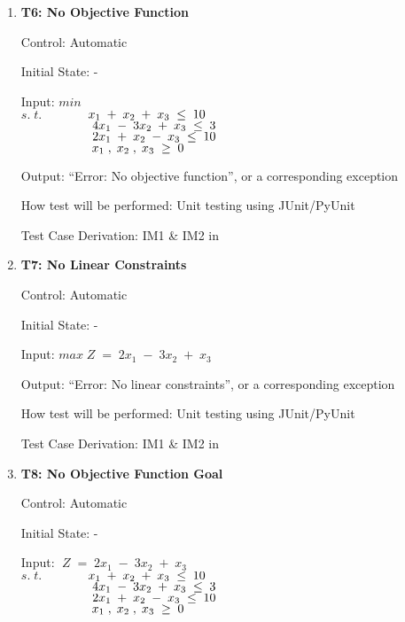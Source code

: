 \documentclass[12pt, titlepage]{article}
\begin{document}

\begin{enumerate}
	\item{\textbf{T6: No Objective Function}}
	
	Control: Automatic
	
	Initial State: -
	
	Input: $min $\\
	$s.\;t.$$\hspace*{1.3cm} x_1\;+\;x_2\;+\;x_3\; \leq \;10$\\
	$\hspace*{2cm} 4x_1\;-\;3x_2\;+\;x_3\; \leq \;3$\\
	$\hspace*{2cm} 2x_1\;+\;x_2\;-\;x_3\; \leq \;10$\\
	$\hspace*{2cm} x_1\;,\;x_2\;,\;x_3\; \geq \;0$
	
	Output: ``Error: No objective function'', or a corresponding exception
	
	How test will be performed: Unit testing using JUnit/PyUnit
	
	Test Case Derivation: IM1 \& IM2 in \cite{losms-ca}
	
	\item{\textbf{T7: No Linear Constraints}}
	
	Control: Automatic
	
	Initial State: -
	
	Input: $max\;Z\;=\;2x_1\;-\;3x_2\;+\;x_3$
	
	Output: ``Error: No linear constraints'', or a corresponding exception
	
	How test will be performed: Unit testing using JUnit/PyUnit
	
	Test Case Derivation: IM1 \& IM2 in \cite{losms-ca}
	
	\item{\textbf{T8: No Objective Function Goal}}
	
	Control: Automatic
	
	Initial State: -
	
	Input: $\;Z\;=\;2x_1\;-\;3x_2\;+\;x_3$\\
	$s.\;t.$$\hspace*{1.3cm} x_1\;+\;x_2\;+\;x_3\; \leq \;10$\\
	$\hspace*{2cm} 4x_1\;-\;3x_2\;+\;x_3\; \leq \;3$\\
	$\hspace*{2cm} 2x_1\;+\;x_2\;-\;x_3\; \leq \;10$\\
	$\hspace*{2cm} x_1\;,\;x_2\;,\;x_3\; \geq \;0$
	

\end{enumerate}
\end{document}
